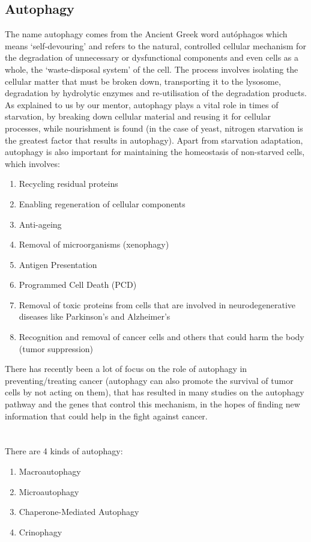 \documentclass[12pt, a4paper]{report}
\begin{document}
\subsection*{Autophagy} 


The name autophagy comes from the Ancient Greek word autóphagos which means ‘self-devouring’ and refers to the natural, controlled cellular mechanism for the degradation of unnecessary or dysfunctional components and even cells as a whole, the ‘waste-disposal system’ of the cell. The process involves isolating the cellular matter that must be broken down, transporting it to the lysosome, degradation by hydrolytic enzymes and re-utilisation of the degradation products. As explained to us by our mentor, autophagy plays a vital role in times of starvation, by breaking down cellular material and reusing it for cellular processes, while nourishment is found (in the case of yeast, nitrogen starvation is the greatest factor that results in autophagy). Apart from starvation adaptation, autophagy is also important for maintaining the homeostasis of non-starved cells, which involves: 
\\
\begin{enumerate}
\item Recycling residual proteins 
\item Enabling regeneration of cellular components 
\item Anti-ageing 
\item Removal of microorganisms (xenophagy) 
\item Antigen Presentation 
\item Programmed Cell Death (PCD)  
\item Removal of toxic proteins from cells that are involved in neurodegenerative diseases like Parkinson’s and Alzheimer’s 
\item Recognition and removal of cancer cells and others that could harm the body (tumor suppression)
\end{enumerate} 

There has recently been a lot of focus on the role of autophagy in preventing/treating cancer (autophagy can also promote the survival of tumor cells by not acting on them), that has resulted in many studies on the autophagy pathway and the genes that control this mechanism, in the hopes of finding new information that could help in the fight against cancer. 
\\~\\~\\
There are 4 kinds of autophagy: 
\begin{enumerate}
    \item Macroautophagy 
    \item Microautophagy 
    \item Chaperone-Mediated Autophagy 
    \item Crinophagy 
\end{enumerate} 
\end{document}
